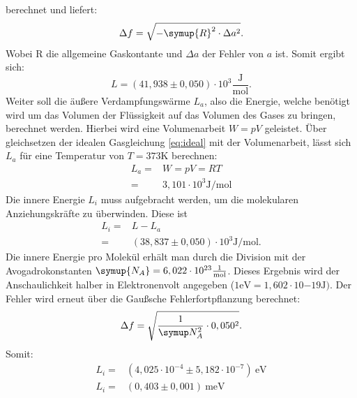berechnet und liefert:
\begin{equation}
  \Delta f = \sqrt{-\symup{R}^2 \cdot \Delta a^2}.
\end{equation}
Wobei R die allgemeine Gaskontante und $\Delta a$ der Fehler von $a$ ist.
Somit ergibt sich:
\begin{equation*}
  L=(41,938 \pm 0,050)\cdot 10^3 \frac{\si{\joule}}{\si{\mol}}.
\end{equation*}
\newpage
Weiter soll die äußere Verdampfungswärme $L_a$, also die Energie, welche
benötigt wird um das Volumen der Flüssigkeit auf das Volumen des Gases
zu bringen, berechnet werden. Hierbei wird eine Volumenarbeit $W=pV$ geleistet.
Über gleichsetzen der idealen Gasgleichung \eqref{eq:ideal} mit der
Volumenarbeit, lässt sich $L_a$ für eine Temperatur von $T=373 \si{\kelvin}$
berechnen:
\begin{align*}
  L_a =& W =pV=RT \\
      =& 3,101 \cdot 10^3 \si{\joule \per \mol}
\end{align*}
Die innere Energie $L_i$ muss aufgebracht werden, um die molekularen
Anziehungskräfte zu überwinden. Diese ist
\begin{align*}
  L_i=&L-L_a \\
  =& (38,837 \pm 0,050)\cdot 10^3 \si{\joule\per\mol}.
\end{align*}
 Die innere Energie pro Molekül erhält man durch die Division mit der Avogadrokonstanten
 $\symup{N_A}=6,022 \cdot 10^{23} \frac{1}{\si{\mol}}$.
 Dieses Ergebnis wird der Anschaulichkeit halber in Elektronenvolt angegeben
 ($1\si{\electronvolt}=1,602\cdot 10{{-19}}\si{\joule})$.
 Der Fehler wird erneut über die Gaußsche Fehlerfortpflanzung berechnet:
 \begin{equation*}
   \Delta f=\sqrt{\frac{1}{\symup N_A^2}\cdot 0,050^2}.
 \end{equation*}
 Somit:
 \begin{align*}
   L_i =&(4,025\cdot 10^{-4} \pm 5,182\cdot 10^{-7})\ \si{\electronvolt} \\
   L_i =&(0,403 \pm 0,001) \ \si{\milli\electronvolt}
 \end{align*}
